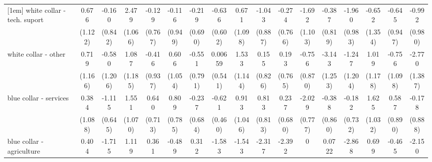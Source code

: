 {\begin{tabular}{l*{16}{c}}
[1em]
white collar - tech. suport&       0.676         &      -0.160         &       2.479\sym{*}  &      -0.129         &      -0.116         &      -0.219         &      -0.636         &       0.671         &      -1.043         &      -0.274         &      -1.692         &      -0.387         &      -1.960\sym{*}  &      -0.652         &      -0.645         &      -0.992         \\
                    &     (1.122)         &     (0.842)         &     (1.066)         &     (0.767)         &     (0.949)         &     (0.690)         &     (0.602)         &     (1.098)         &     (0.887)         &     (0.766)         &     (1.103)         &     (0.819)         &     (0.983)         &     (1.354)         &     (0.947)         &     (0.980)         \\
[1em]
white collar - other&       0.719         &      -0.580         &       1.087         &      -0.416         &       0.606         &      -0.551         &     0.00659         &       1.533         &       0.155         &       0.193         &      -0.756         &      -3.143\sym{*}  &      -1.247         &       1.019         &      -0.756         &      -2.770\sym{*}  \\
                    &     (1.166)         &     (1.206)         &     (1.185)         &     (0.937)         &     (1.054)         &     (0.791)         &     (0.541)         &     (1.144)         &     (0.826)         &     (0.765)         &     (0.870)         &     (1.253)         &     (1.204)         &     (1.178)         &     (1.098)         &     (1.387)         \\
[1em]
blue collar - services&       0.384         &      -1.115         &       1.551         &       0.640         &       0.809         &      -0.237         &      -0.621         &       0.913         &       0.813         &       0.237         &      -2.029\sym{**} &      -0.388         &      -0.182         &       1.625         &       0.587         &      -0.178         \\
                    &     (1.088)         &     (0.645)         &     (1.070)         &     (0.713)         &     (0.785)         &     (0.684)         &     (0.460)         &     (1.046)         &     (0.813)         &     (0.680)         &     (0.777)         &     (0.860)         &     (0.732)         &     (1.032)         &     (0.890)         &     (0.888)         \\
[1em]
blue collar - agriculture&       0.404         &      -1.715         &       1.119         &       0.361         &      -0.489         &       0.312         &      -1.583         &      -1.543         &      -2.317         &      -2.392\sym{*}  &           0         &      0.0722         &      -2.868\sym{*}  &       0.699         &      -0.465         &      -2.150         \\

\end{tabular}}
